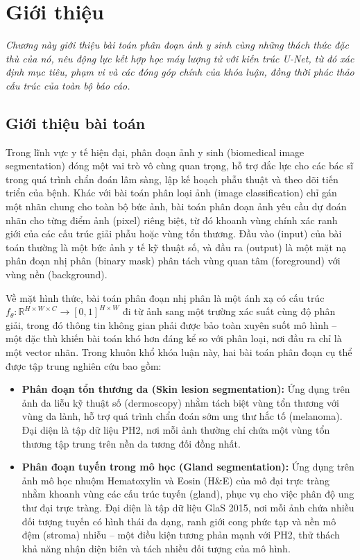 \chapter{Giới thiệu}
\label{Chapter1}

\textit{Chương này giới thiệu bài toán phân đoạn ảnh y sinh cùng những thách thức đặc thù của nó, nêu động lực kết hợp học máy lượng tử với kiến trúc U-Net, từ đó xác định mục tiêu, phạm vi và các đóng góp chính của khóa luận, đồng thời phác thảo cấu trúc của toàn bộ báo cáo.}

\section{Giới thiệu bài toán}
Trong lĩnh vực y tế hiện đại, phân đoạn ảnh y sinh (biomedical image segmentation) đóng một vai trò vô cùng quan trọng, hỗ trợ đắc lực cho các bác sĩ trong quá trình chẩn đoán lâm sàng, lập kế hoạch phẫu thuật và theo dõi tiến triển của bệnh. Khác với bài toán phân loại ảnh (image classification) chỉ gán một nhãn chung cho toàn bộ bức ảnh, bài toán phân đoạn ảnh yêu cầu dự đoán nhãn cho từng điểm ảnh (pixel) riêng biệt, từ đó khoanh vùng chính xác ranh giới của các cấu trúc giải phẫu hoặc vùng tổn thương. Đầu vào (input) của bài toán thường là một bức ảnh y tế kỹ thuật số, và đầu ra (output) là một mặt nạ phân đoạn nhị phân (binary mask) phân tách vùng quan tâm (foreground) với vùng nền (background).

Về mặt hình thức, bài toán phân đoạn nhị phân là một ánh xạ có cấu trúc $f_\theta: \mathbb{R}^{H\times W\times C}\!\to\![0,1]^{H\times W}$ đi từ ảnh sang một trường xác suất cùng độ phân giải, trong đó thông tin không gian phải được bảo toàn xuyên suốt mô hình -- một đặc thù khiến bài toán khó hơn đáng kể so với phân loại, nơi đầu ra chỉ là một vector nhãn. Trong khuôn khổ khóa luận này, hai bài toán phân đoạn cụ thể được tập trung nghiên cứu bao gồm:
\begin{itemize}
    \item \textbf{Phân đoạn tổn thương da (Skin lesion segmentation):} Ứng dụng trên ảnh da liễu kỹ thuật số (dermoscopy) nhằm tách biệt vùng tổn thương với vùng da lành, hỗ trợ quá trình chẩn đoán sớm ung thư hắc tố (melanoma). Đại diện là tập dữ liệu PH2, nơi mỗi ảnh thường chỉ chứa một vùng tổn thương tập trung trên nền da tương đối đồng nhất.
    \item \textbf{Phân đoạn tuyến trong mô học (Gland segmentation):} Ứng dụng trên ảnh mô học nhuộm Hematoxylin và Eosin (H\&E) của mô đại trực tràng nhằm khoanh vùng các cấu trúc tuyến (gland), phục vụ cho việc phân độ ung thư đại trực tràng. Đại diện là tập dữ liệu GlaS 2015, nơi mỗi ảnh chứa nhiều đối tượng tuyến có hình thái đa dạng, ranh giới cong phức tạp và nền mô đệm (stroma) nhiễu -- một điều kiện tương phản mạnh với PH2, thử thách khả năng nhận diện biên và tách nhiều đối tượng của mô hình.
\end{itemize}

